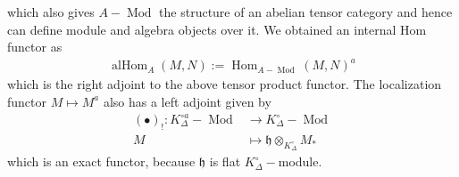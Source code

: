 \documentclass[12pts,a4paper]{amsart}
\DeclareMathOperator{\Hom}{Hom}
\DeclareMathOperator{\Mod}{Mod}
\DeclareMathOperator{\alHom}{alHom}
\begin{document}
which also gives $A-\Mod$ the structure of an abelian tensor category and hence can define module and algebra objects over it. We obtained an internal Hom functor as
\begin{align*}
    \alHom_A(M,N):=\Hom_{A-\Mod}(M,N)^a
\end{align*}
which is the right adjoint to the above tensor product functor. The localization functor $M\mapsto M^a$ also has a left adjoint given by
\begin{align*}
    (\bullet)_!:K^{\circ a}_\Delta-\Mod&\to K^\circ_\Delta-\Mod\\
                                      M&\mapsto \mathfrak{h}\otimes_{K^\circ_\Delta}M_*
\end{align*}
which is an exact functor, because $\mathfrak{h}$ is flat $K^{\circ}_\Delta-$module.
\end{document}
